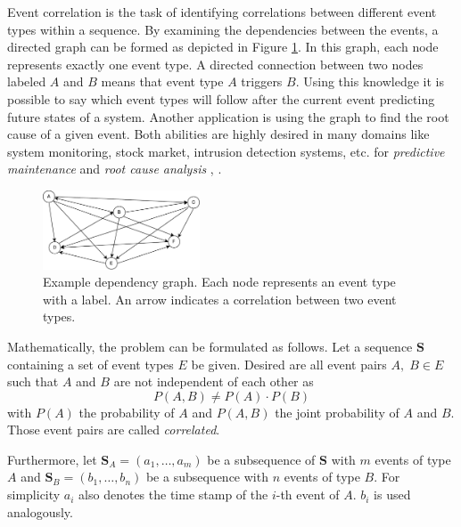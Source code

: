 \documentclass[conference]{IEEEtran}
\theoremstyle{examplestyle}
\newcommand\imgsize{0.415}
\begin{document}
Event correlation is the task of identifying correlations between different event types within a sequence. By examining the dependencies between the events, a directed graph can be formed as depicted in Figure \ref{fig:exampleDependencyGraph}. In this graph, each node represents exactly one event type. A directed connection between two nodes labeled \(A\) and \(B\) means that event type \(A\) triggers \(B\). Using this knowledge it is possible to say which event types will follow after the current event predicting future states of a system. Another application is using the graph to find the root cause of a given event. Both abilities are highly desired in many domains like system monitoring, stock market, intrusion detection systems, etc. for \textit{predictive maintenance} and \textit{root cause analysis} \cite{Zeng2015}, \cite{Benferhat2008}.


\begin{figure}[!tb]
	\centering
	\includegraphics[width=\imgsize\textwidth]{images/graph.pdf}
	\caption{Example dependency graph. Each node represents an event type with a label. An arrow indicates a correlation between two event types.}
	
	\label{fig:exampleDependencyGraph}
\end{figure}


Mathematically, the problem can be formulated as follows. Let a sequence \(\pmb{S}\) containing a set of event types \(E\) be given. Desired are all event pairs \(A, \; B \in E\) such that \(A\) and \(B\) are not independent of each other as
\begin{equation}
	P(A, B) \neq P(A) \cdot P(B)
\end{equation}
with \(P(A)\) the probability of \(A\) and \(P(A, B)\) the joint probability of \(A\) and \(B\). Those event pairs are called \textit{correlated}.

Furthermore, let \(\pmb{S}_A = (a_1,\ldots, a_m)\) be a subsequence of \(\pmb{S}\) with \(m\) events of type \(A\) and \(\pmb{S}_B=(b_1,\ldots, b_n)\) be a subsequence with \(n\) events of type \(B\). For simplicity \(a_i\) also denotes the time stamp of the \(i\)-th event of \(A\). \(b_i\) is used analogously.
\end{document}
